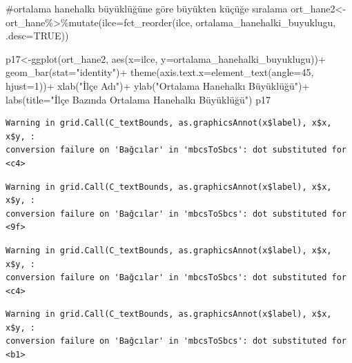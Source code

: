 \documentclass[
  11pt,
  a4paper,
  DIV=11,
  numbers=noendperiod]{scrartcl}
\newenvironment{Shaded}{\begin{snugshade}}{\end{snugshade}}
\newcommand{\AttributeTok}[1]{\textcolor[rgb]{0.40,0.45,0.13}{#1}}
\newcommand{\CommentTok}[1]{\textcolor[rgb]{0.37,0.37,0.37}{#1}}
\newcommand{\ConstantTok}[1]{\textcolor[rgb]{0.56,0.35,0.01}{#1}}
\newcommand{\DecValTok}[1]{\textcolor[rgb]{0.68,0.00,0.00}{#1}}
\newcommand{\FunctionTok}[1]{\textcolor[rgb]{0.28,0.35,0.67}{#1}}
\newcommand{\NormalTok}[1]{\textcolor[rgb]{0.00,0.23,0.31}{#1}}
\newcommand{\OtherTok}[1]{\textcolor[rgb]{0.00,0.23,0.31}{#1}}
\newcommand{\SpecialCharTok}[1]{\textcolor[rgb]{0.37,0.37,0.37}{#1}}
\newcommand{\StringTok}[1]{\textcolor[rgb]{0.13,0.47,0.30}{#1}}
\begin{document}
\begin{Shaded}
\begin{Highlighting}[]
\CommentTok{\#ortalama hanehalkı büyüklüğüne göre büyükten küçüğe sıralama}
\NormalTok{ort\_hane2}\OtherTok{\textless{}{-}}\NormalTok{ort\_hane}\SpecialCharTok{\%\textgreater{}\%}\FunctionTok{mutate}\NormalTok{(}\AttributeTok{ilce=}\FunctionTok{fct\_reorder}\NormalTok{(ilce, ortalama\_hanehalki\_buyuklugu, }\AttributeTok{.desc=}\ConstantTok{TRUE}\NormalTok{))}

\NormalTok{p17}\OtherTok{\textless{}{-}}\FunctionTok{ggplot}\NormalTok{(ort\_hane2, }\FunctionTok{aes}\NormalTok{(}\AttributeTok{x=}\NormalTok{ilce, }\AttributeTok{y=}\NormalTok{ortalama\_hanehalki\_buyuklugu))}\SpecialCharTok{+}
  \FunctionTok{geom\_bar}\NormalTok{(}\AttributeTok{stat=}\StringTok{"identity"}\NormalTok{)}\SpecialCharTok{+}
  \FunctionTok{theme}\NormalTok{(}\AttributeTok{axis.text.x=}\FunctionTok{element\_text}\NormalTok{(}\AttributeTok{angle=}\DecValTok{45}\NormalTok{, }\AttributeTok{hjust=}\DecValTok{1}\NormalTok{))}\SpecialCharTok{+}
  \FunctionTok{xlab}\NormalTok{(}\StringTok{"İlçe Adı"}\NormalTok{)}\SpecialCharTok{+}
  \FunctionTok{ylab}\NormalTok{(}\StringTok{"Ortalama Hanehalkı Büyüklüğü"}\NormalTok{)}\SpecialCharTok{+}
  \FunctionTok{labs}\NormalTok{(}\AttributeTok{title=}\StringTok{"İlçe Bazında Ortalama Hanehalkı Büyüklüğü"}\NormalTok{)}
\NormalTok{p17}
\end{Highlighting}
\end{Shaded}

\begin{verbatim}
Warning in grid.Call(C_textBounds, as.graphicsAnnot(x$label), x$x, x$y, :
conversion failure on 'Bağcılar' in 'mbcsToSbcs': dot substituted for <c4>
\end{verbatim}

\begin{verbatim}
Warning in grid.Call(C_textBounds, as.graphicsAnnot(x$label), x$x, x$y, :
conversion failure on 'Bağcılar' in 'mbcsToSbcs': dot substituted for <9f>
\end{verbatim}

\begin{verbatim}
Warning in grid.Call(C_textBounds, as.graphicsAnnot(x$label), x$x, x$y, :
conversion failure on 'Bağcılar' in 'mbcsToSbcs': dot substituted for <c4>
\end{verbatim}

\begin{verbatim}
Warning in grid.Call(C_textBounds, as.graphicsAnnot(x$label), x$x, x$y, :
conversion failure on 'Bağcılar' in 'mbcsToSbcs': dot substituted for <b1>
\end{verbatim}
\end{document}
